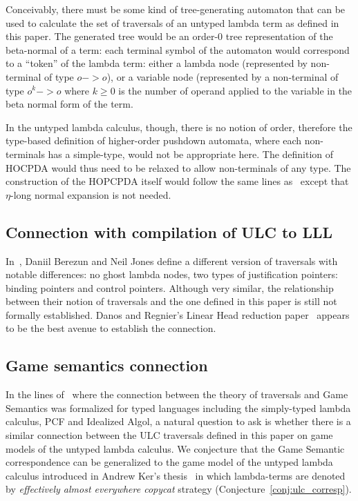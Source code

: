\documentclass{article}
\theoremstyle{definition}
\begin{document}
Conceivably, there must be some kind of tree-generating automaton that can be used to calculate the set of traversals of an untyped lambda term as defined in this paper. The generated tree would be an order-$0$ tree representation of the beta-normal of a term: each terminal symbol of the automaton would correspond to a ``token'' of the lambda term: either a lambda node (represented by non-terminal of type $o->o$), or a variable node (represented by a non-terminal of type $o^k->o$ where $k\geq0$ is the number of operand applied to the variable in the beta normal form of the term.

In the untyped lambda calculus, though, there is no notion of order, therefore the type-based definition of higher-order pushdown automata, where each non-terminals has a simple-type, would not be appropriate here. The definition of HOCPDA would thus need to be relaxed to allow non-terminals of any type. The construction of the HOPCPDA itself would follow the same lines as~\cite{Ong2006} except that $\eta$-long normal expansion is not needed.

\subsection{Connection with compilation of ULC to LLL}

In~\cite{JonesBerezunLLL}, Daniil Berezun and Neil Jones define a different version of traversals with notable differences: no ghost lambda nodes, two types of justification pointers: binding pointers and control pointers. Although very similar, the relationship between their notion of traversals and the one defined in this paper is still not formally established. Danos and Regnier's Linear Head reduction paper~\cite{danos-head} appears to be the best avenue to establish the connection.


\subsection{Game semantics connection}

In the lines of~\cite{BlumPhd} where the connection between the theory of traversals and Game Semantics was formalized for typed languages including the simply-typed lambda calculus, PCF and Idealized Algol, a natural question to ask is whether there is a similar connection between the ULC traversals defined in this paper on game models of the untyped lambda calculus. We conjecture that the Game Semantic correspondence can be generalized to the game model of the untyped lambda calculus introduced in Andrew Ker's thesis~\cite{KerThesis} in which lambda-terms are denoted by \emph{effectively almost everywhere copycat} strategy  (Conjecture~\ref{conj:ulc_corresp}).
\end{document}
